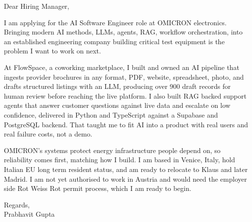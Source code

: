 \documentclass[a4paper,11pt]{article}
\begin{document}
Dear Hiring Manager,

I am applying for the AI Software Engineer role at OMICRON electronics. Bringing modern AI methods, LLMs, agents, RAG, workflow orchestration, into an established engineering company building critical test equipment is the problem I want to work on next.

At FlowSpace, a coworking marketplace, I built and owned an AI pipeline that ingests provider brochures in any format, PDF, website, spreadsheet, photo, and drafts structured listings with an LLM, producing over 900 draft records for human review before reaching the live platform. I also built RAG backed support agents that answer customer questions against live data and escalate on low confidence, delivered in Python and TypeScript against a Supabase and PostgreSQL backend. That taught me to fit AI into a product with real users and real failure costs, not a demo.

OMICRON's systems protect energy infrastructure people depend on, so reliability comes first, matching how I build. I am based in Venice, Italy, hold Italian EU long term resident status, and am ready to relocate to Klaus and later Madrid. I am not yet authorised to work in Austria and would need the employer side Rot Weiss Rot permit process, which I am ready to begin.

Regards,\\
Prabhavit Gupta
\end{document}
